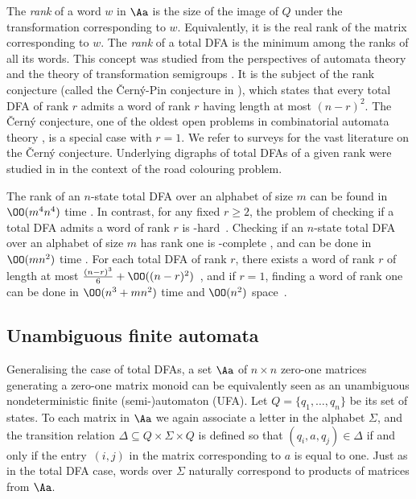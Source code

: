 The \emph{rank} of a word $w$ in $\Aa$ is the size of the image of $Q$ under the transformation corresponding to $w$. Equivalently, it is the real rank of the matrix corresponding to $w$.
The \emph{rank} of a total DFA is the minimum among the ranks of all its words. This concept was studied from the perspectives of automata theory \cite{Rystsov1992Rank,Kari2019} and the theory of transformation semigroups \cite{Shin2010Rank,Karimi2017MinIdeal}. It is the subject of the rank conjecture (called the \v{C}ern\'{y}-Pin conjecture in \cite{Rystsov1992Rank}), which states that every total DFA of rank $r$ admits a word of rank $r$ having length at most $(n - r)^2$. The \v{C}ern\'{y} conjecture, one of the oldest open problems in combinatorial automata theory \cite{Volkov2022}, is a special case with $r = 1$. We refer to surveys \cite{Volkov2008,Beal2016,Kari2019,Volkov2022} for the vast literature on the \v{C}ern\'{y} conjecture. Underlying digraphs of total DFAs of a given rank were studied in \cite{Budzban2011Generalized,Beal2016} in the context of the road colouring problem.

The rank of an $n$-state total DFA over an alphabet of size $m$ can be found in $\OO(m^4n^4)$ time \cite[Theorem 1]{Rystsov1992Rank}.
In contrast, for any fixed $r \ge 2$, the problem of checking if a total DFA admits a word of rank $r$ is \NP-hard~\cite{GORALCIK1995}. Checking if an $n$-state total DFA over an alphabet of size $m$ has rank one is \NL-complete \cite{Holzer2018,Volkov2022}, and can be done in $\OO(m n^2)$ time \cite{Eppstein1990,Volkov2008}. For each total DFA of rank $r$, there exists a word of rank $r$ of length at most $\frac{(n - r)^3}{6} + \OO((n - r)^2)$~\cite{Klyachko1987}, and if $r = 1$,  finding a word of rank one can be done in $\OO(n^3 + mn^2)$ time and $\OO(n^2)$ space~\cite{Eppstein1990}.

\subsection{Unambiguous finite automata}

Generalising the case of total DFAs, a set $\Aa$ of $n \times n$ zero-one matrices generating a zero-one matrix monoid can be equivalently seen as an unambiguous nondeterministic finite (semi-)automaton (UFA). Let $Q = \{q_1, \ldots, q_n\}$ be its set of states. To each matrix in $\Aa$ we again associate a letter in the alphabet $\Sigma$, and the transition relation $\Delta \subseteq Q \times \Sigma \times Q$ is defined so that $(q_i,a,q_j) \in \Delta$ if and only if the entry~$(i, j)$ in the matrix corresponding to $a$ is equal to one. Just as in the total DFA case, words over $\Sigma$ naturally correspond to products of matrices from $\Aa$.

